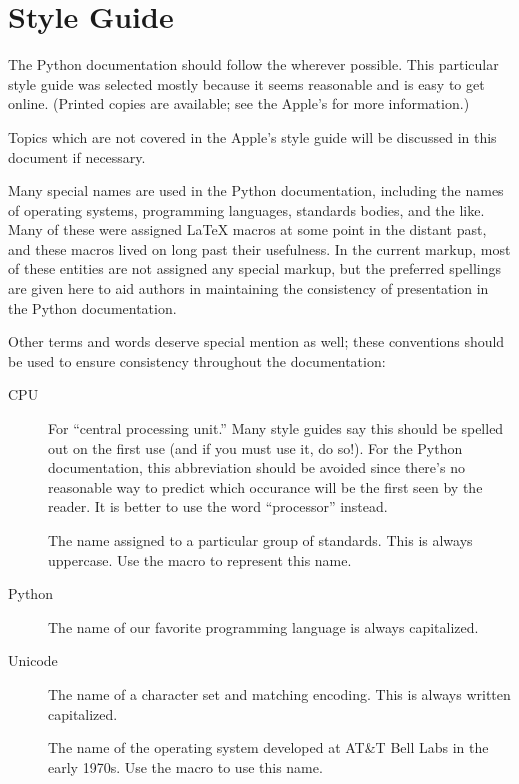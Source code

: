 \documentclass{howto}
\begin{document}
\section{Style Guide}

  The Python documentation should follow the  wherever possible.  This particular
  style guide was selected mostly because it seems reasonable and is
  easy to get online.  (Printed copies are available; see the Apple's
   for more information.)

  Topics which are not covered in the Apple's style guide will be
  discussed in this document if necessary.

  Many special names are used in the Python documentation, including
  the names of operating systems, programming languages, standards
  bodies, and the like.  Many of these were assigned \LaTeX{} macros
  at some point in the distant past, and these macros lived on long
  past their usefulness.  In the current markup, most of these entities
  are not assigned any special markup, but the preferred spellings are
  given here to aid authors in maintaining the consistency of
  presentation in the Python documentation.

  Other terms and words deserve special mention as well; these conventions
  should be used to ensure consistency throughout the documentation:

  \begin{description}
    \item[CPU]
    For ``central processing unit.''  Many style guides say this
    should be spelled out on the first use (and if you must use it,
    do so!).  For the Python documentation, this abbreviation should
    be avoided since there's no reasonable way to predict which occurance
    will be the first seen by the reader.  It is better to use the
    word ``processor'' instead.

    \item[\POSIX]
	The name assigned to a particular group of standards.  This is
	always uppercase.  Use the macro  to represent this
    name.

    \item[Python]
	The name of our favorite programming language is always
	capitalized.

    \item[Unicode]
	The name of a character set and matching encoding.  This is
    always written capitalized.

    \item[\UNIX]
    The name of the operating system developed at AT\&T Bell Labs
    in the early 1970s.  Use the macro  to use this name.
  \end{description}
\end{document}
